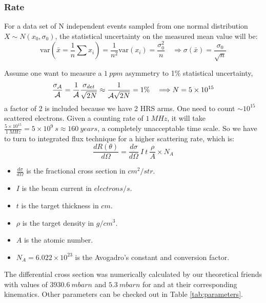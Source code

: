 \subsubsection{Rate}
For a data set of N independent events sampled from one normal distribution 
$X\sim N(x_0, \sigma_0)$, the statistical uncertainty on the measured mean value
will be:
$$ \text{var}(\bar{x} = \frac{1}{n}\sum x_i) = \frac{1}{n^2}\text{var}(x_i) = \frac{\sigma_0^2}{n} 
\quad \Longrightarrow \sigma(\bar{x}) = \frac{\sigma_0}{\sqrt{n}} $$

Assume one want to measure a $1 \ ppm$ asymmetry to 1\% statistical uncertainty,
\begin{equation}
    \frac{\sigma_{\mathcal{A}}}{\mathcal{A}} = \frac{1}{\mathcal{A}}\frac{\sigma_{det}}{\sqrt{2N}} 
    \approx \frac{1}{\mathcal{A}\sqrt{2N}} = 1\% \quad 
    \Longrightarrow N = 5 \times 10^{15} 
    \label{eq:statistical_error}
\end{equation}
a factor of 2 is included because we have 2 HRS arms.
One need to count $\sim10^{15}$ scattered electrons. Given a counting rate of $1\ MHz$, 
it will take $\frac{5\times 10^{15}}{1\ MHz} = 5\times 10^{9}\ s \approx 160 \ years$,
a completely unacceptable time scale. So we have to turn to integrated flux technique
for a higher scattering rate, which is:
\begin{equation}
    \frac{dR(\theta)}{d\Omega} = \frac{d\sigma}{d\Omega}\ I\ t\ \frac{\rho}{A} \times N_A   
\end{equation}
\begin{itemize}
    \item $\frac{d\sigma}{d\Omega}$ is the fractional cross section in $cm^2/str$.
    \item $I$ is the beam current in $electrons/s$.
    \item $t$ is the target thickness in $cm$.
    \item $\rho$ is the target density in $g/cm^{3}$.
    \item $A$ is the atomic number.
    \item $N_A = 6.022\times 10^{23}$ is the Avogadro's constant and conversion factor.
\end{itemize}

The differential cross section was numerically calculated by our theoretical friends
with values of $3930.6 \ mbarn$ and $5.3 \ mbarn$ for \Pb and \Ca at their corresponding
kinematics. Other parameters can be checked out in Table \ref{tab:parameters}.

